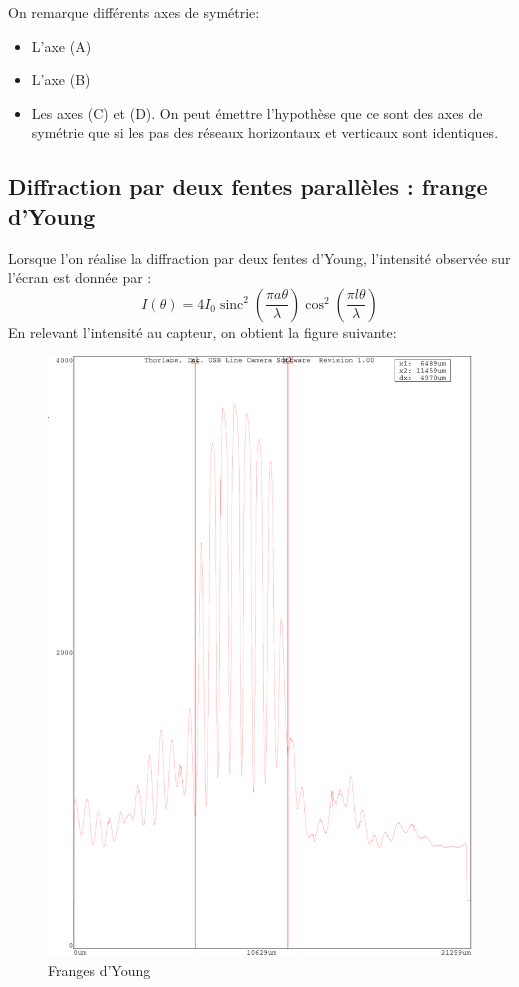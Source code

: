 \documentclass[12pt,a4paper]{article}
\DeclareMathOperator{\sinc}{sinc}
\begin{document}
	
	On remarque différents axes de symétrie:
	\begin{itemize}
		\item L'axe (A)
		\item L'axe (B)
		\item Les axes (C) et (D). On peut émettre l'hypothèse que ce sont des axes de symétrie que si les pas des réseaux horizontaux et verticaux sont identiques.
	\end{itemize}
	\subsection{Diffraction par deux fentes parallèles : frange d'Young}
	Lorsque l'on réalise la diffraction par deux fentes d'Young, l'intensité observée sur l'écran est donnée par :
	$$I(\theta)=4I_0\sinc^2\left( {\dfrac{\pi a \theta}{\lambda}}\right) \cos^2\left(\dfrac{\pi l \theta}{\lambda}\right)$$
	En relevant l'intensité au capteur, on obtient la figure suivante:
	\begin{figure}[h]
		\centering
		\includegraphics[scale=0.5]{"res/Young OK"}
		\caption{Franges d'Young}
	\end{figure}
	
\end{document}
